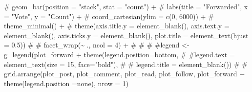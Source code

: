 \documentclass[
  letterpaper,
  DIV=11,
  numbers=noendperiod]{scrartcl}
\newenvironment{Shaded}{\begin{snugshade}}{\end{snugshade}}
\newcommand{\AttributeTok}[1]{\textcolor[rgb]{0.40,0.45,0.13}{#1}}
\newcommand{\CommentTok}[1]{\textcolor[rgb]{0.37,0.37,0.37}{#1}}
\newcommand{\FunctionTok}[1]{\textcolor[rgb]{0.28,0.35,0.67}{#1}}
\newcommand{\NormalTok}[1]{\textcolor[rgb]{0.00,0.23,0.31}{#1}}
\newcommand{\OtherTok}[1]{\textcolor[rgb]{0.00,0.23,0.31}{#1}}
\newcommand{\SpecialCharTok}[1]{\textcolor[rgb]{0.37,0.37,0.37}{#1}}
\newcommand{\StringTok}[1]{\textcolor[rgb]{0.13,0.47,0.30}{#1}}
\begin{document}
\begin{Shaded}
\begin{Highlighting}[]
\CommentTok{\#   geom\_bar(position = "stack", stat = "count") +}
\CommentTok{\#   labs(title = "Forwarded", x = "Vote", y = "Count") +}
\CommentTok{\#   coord\_cartesian(ylim = c(0, 6000)) +}
\CommentTok{\#   theme\_minimal() +}
\CommentTok{\#   theme(axis.title.y = element\_blank(), axis.text.y = element\_blank(), axis.ticks.y = element\_blank(), plot.title = element\_text(hjust = 0.5)) }
\CommentTok{\#  \# facet\_wrap(\textasciitilde{} ., ncol = 4) +}
\CommentTok{\# }
\CommentTok{\# }
\CommentTok{\# \#legend \textless{}{-} g\_legend(plot\_forward + theme(legend.position=\textquotesingle{}bottom\textquotesingle{}, }
\CommentTok{\#                                         \#legend.text = element\_text(size = 15, face="bold"), }
\CommentTok{\#                                        \# legend.title = element\_blank())}
\CommentTok{\# }
\CommentTok{\# grid.arrange(plot\_post, plot\_comment, plot\_read, plot\_follow, plot\_forward + theme(legend.position =\textquotesingle{}none\textquotesingle{}), nrow = 1)}
\end{Highlighting}
\end{Shaded}

\begin{Shaded}
\end{Shaded}
\end{document}
